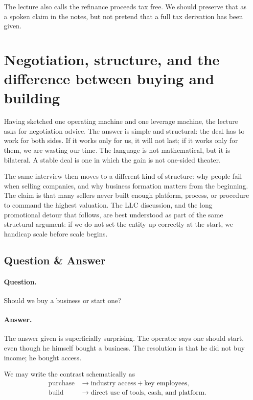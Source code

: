 The lecture also calls the refinance proceeds tax free. We should preserve that as a spoken claim in the notes, but not pretend that a full tax derivation has been given.

\section{Negotiation, structure, and the difference between buying and building}

Having sketched one operating machine and one leverage machine, the lecture asks for negotiation advice. The answer is simple and structural: the deal has to work for both sides. If it works only for us, it will not last; if it works only for them, we are wasting our time. The language is not mathematical, but it is bilateral. A stable deal is one in which the gain is not one-sided theater.

The same interview then moves to a different kind of structure: why people fail when selling companies, and why business formation matters from the beginning. The claim is that many sellers never built enough platform, process, or procedure to command the highest valuation. The LLC discussion, and the long promotional detour that follows, are best understood as part of the same structural argument: if we do not set the entity up correctly at the start, we handicap scale before scale begins.

\subsection{Question \& Answer}

\paragraph{Question.}
Should we buy a business or start one?

\paragraph{Answer.}
The answer given is superficially surprising. The operator says one should start, even though he himself bought a business. The resolution is that he did not buy income; he bought access.

We may write the contrast schematically as
\begin{align}
\text{purchase} &\longrightarrow \text{industry access} + \text{key employees},\\
\text{build} &\longrightarrow \text{direct use of tools, cash, and platform}.
\end{align}

